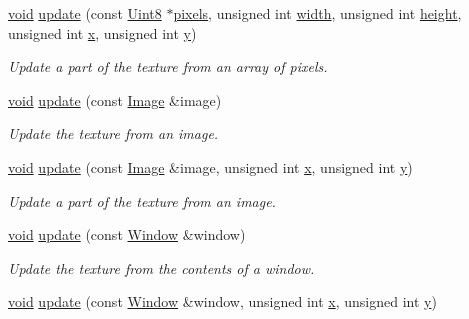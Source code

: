\begin{DoxyCompactItemize}
\hyperlink{glutf90_8h_ac778d6f63f1aaf8ebda0ce6ac821b56e}{void} \hyperlink{classsf_1_1_texture_a1352d8e16c2aeb4df586ed65dd2c36b9}{update} (const \hyperlink{namespacesf_a4ef3d630785c4f296f9b4f274c33d78e}{Uint8} $\ast$\hyperlink{gl3_8h_ada7ad693ea2e311b8103f4693fc35f80}{pixels}, unsigned int \hyperlink{gl3_8h_a9d14ddc31c6c8b61f3fe3679ab976133}{width}, unsigned int \hyperlink{gl3_8h_a67001679ebf2bb0ba972db4d29c6550c}{height}, unsigned int \hyperlink{gl3_8h_a92d0386e5c19fb81ea88c9f99644ab1d}{x}, unsigned int \hyperlink{gl3_8h_a66ddd433d2cacfe27f5906b7e86faeed}{y})
\begin{DoxyCompactList}\small\item\em Update a part of the texture from an array of pixels. \end{DoxyCompactList}\item 
\hyperlink{glutf90_8h_ac778d6f63f1aaf8ebda0ce6ac821b56e}{void} \hyperlink{classsf_1_1_texture_a037cdf171af0fb392d07626a44a4ea17}{update} (const \hyperlink{classsf_1_1_image}{Image} \&image)
\begin{DoxyCompactList}\small\item\em Update the texture from an image. \end{DoxyCompactList}\item 
\hyperlink{glutf90_8h_ac778d6f63f1aaf8ebda0ce6ac821b56e}{void} \hyperlink{classsf_1_1_texture_a87f916490b757fe900798eedf3abf3ba}{update} (const \hyperlink{classsf_1_1_image}{Image} \&image, unsigned int \hyperlink{gl3_8h_a92d0386e5c19fb81ea88c9f99644ab1d}{x}, unsigned int \hyperlink{gl3_8h_a66ddd433d2cacfe27f5906b7e86faeed}{y})
\begin{DoxyCompactList}\small\item\em Update a part of the texture from an image. \end{DoxyCompactList}\item 
\hyperlink{glutf90_8h_ac778d6f63f1aaf8ebda0ce6ac821b56e}{void} \hyperlink{classsf_1_1_texture_ad3cceef238f7d5d2108a98dd38c17fc5}{update} (const \hyperlink{classsf_1_1_window}{Window} \&window)
\begin{DoxyCompactList}\small\item\em Update the texture from the contents of a window. \end{DoxyCompactList}\item 
\hyperlink{glutf90_8h_ac778d6f63f1aaf8ebda0ce6ac821b56e}{void} \hyperlink{classsf_1_1_texture_a154f246eb8059b602076009ab1cfd175}{update} (const \hyperlink{classsf_1_1_window}{Window} \&window, unsigned int \hyperlink{gl3_8h_a92d0386e5c19fb81ea88c9f99644ab1d}{x}, unsigned int \hyperlink{gl3_8h_a66ddd433d2cacfe27f5906b7e86faeed}{y})

\end{DoxyCompactItemize}

